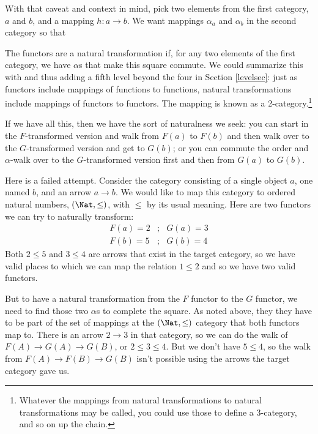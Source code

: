 \documentclass[11pt]{article}
\begin{document}
With that caveat and context in mind, pick two elements from the first category, $a$
and $b$, and a mapping $h:a\to b$.  We want mappings $\alpha_a$ and $\alpha_b$ in the
second category so that


The functors are a natural transformation if, for any two elements of the first category,
we have $\alpha$s that make this square commute. We could summarize this with
and thus adding a fifth level beyond the four in Section \ref{levelsec}: just as
functors include mappings of functions to functions, natural transformations include
mappings of functors to functors. The mapping is known as a 2-category.\footnote{Whatever
the mappings from natural transformations to natural transformations may be called, you could
use those to define a 3-category, and so on up the chain.}


If we have all this, then we have the sort of naturalness we seek: you can
start in the $F$-transformed version and walk from $F(a)$ to $F(b)$ and then walk over to
the $G$-transformed version and get to $G(b)$; or you can commute the order and
$\alpha$-walk over to the $G$-transformed version first and then from $G(a)$ to $G(b)$.

Here is a failed attempt.
Consider the category consisting of a single object $a$, one named $b$, and an arrow $a\to
b$. We would like to map this category to ordered natural numbers, $(\Nat, \leq)$, with
$\leq$ by its usual meaning. Here are two functors we can try to naturally transform:
\begin{eqnarray*}
    F(a) = 2 &;& G(a) = 3\\
    F(b) = 5 &;& G(b) = 4
\end{eqnarray*} 
Both $2 \leq 5$ and $3 \leq 4$ are arrows that exist in the target category, so we have
valid places to which we can map the relation $1\leq 2$ and so we have two valid functors.

But to have a natural transformation from the $F$ functor to the $G$ functor, we need
to find those two $\alpha$s to complete the square. As noted above, they
they have to be part of the set of mappings at the $(\Nat, \leq)$ category that both
functors map to. There is an arrow $2\to 3$ in that category, so we can do the walk
of $F(A) \to G(A) \to G(B)$, or $2 \leq 3 \leq 4$.  But we don't have $5\leq 4$,
so the walk from $F(A)\to F(B) \to G(B)$ isn't possible using the arrows the target
category gave us.
\end{document}
